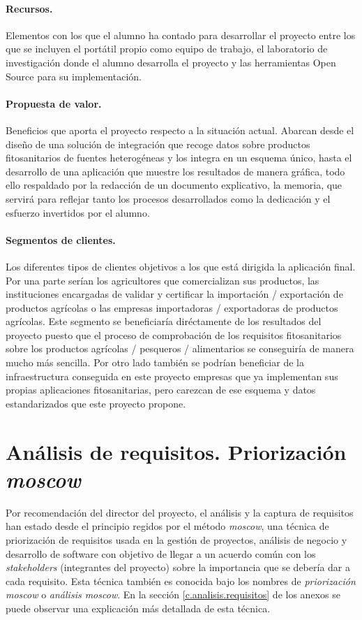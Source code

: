 \paragraph*{Recursos.} Elementos con los que el alumno ha contado para desarrollar el proyecto entre los que se incluyen el portátil propio como equipo de trabajo, el laboratorio de investigación donde el alumno desarrolla el proyecto y las herramientas Open Source para su implementación.

\paragraph*{Propuesta de valor.} Beneficios que aporta el proyecto respecto a la situación actual. Abarcan desde el diseño de una solución de integración que recoge datos sobre productos fitosanitarios de fuentes heterogéneas y los integra en un esquema único, hasta el desarrollo de una aplicación que muestre los resultados de manera gráfica, todo ello respaldado por la redacción de un documento explicativo, la memoria, que servirá para reflejar tanto los procesos desarrollados como la dedicación y el esfuerzo invertidos por el alumno.

\paragraph*{Segmentos de clientes.} Los diferentes tipos de clientes objetivos a los que está dirigida la aplicación final. Por una parte serían los  agricultores que comercializan sus productos, las instituciones encargadas de validar y certificar la importación / exportación  de productos agrícolas o las empresas importadoras / exportadoras de productos agrícolas. Este segmento se beneficiaría diréctamente de los resultados del proyecto puesto que el proceso de comprobación de los requisitos fitosanitarios sobre los productos agrícolas / pesqueros / alimentarios se conseguiría de manera mucho más sencilla. Por otro lado también se podrían beneficiar de la infraestructura conseguida en este proyecto empresas que ya implementan sus propias aplicaciones fitosanitarias, pero carezcan de ese esquema y datos estandarizados que este proyecto propone.




\section{Análisis de requisitos. Priorización \textit{\gls{moscow}}} \label{phytoscheme.requisitos}
\par 
Por recomendación del director del proyecto, el análisis y la captura de requisitos han estado desde el principio  regidos por el método \textit{\gls{moscow}}, una técnica de priorización de requisitos usada en la gestión de proyectos, análisis de negocio y desarrollo de software con objetivo de llegar a un acuerdo común con los \textit{stakeholders} (integrantes del proyecto) sobre la importancia que se debería dar a cada requisito. Esta técnica también es conocida bajo los nombres de \textit{priorización \gls{moscow}} o \textit{análisis \gls{moscow}}. En la sección \ref{c.analisis.requisitos} de los anexos se puede observar una explicación más detallada de esta técnica.

